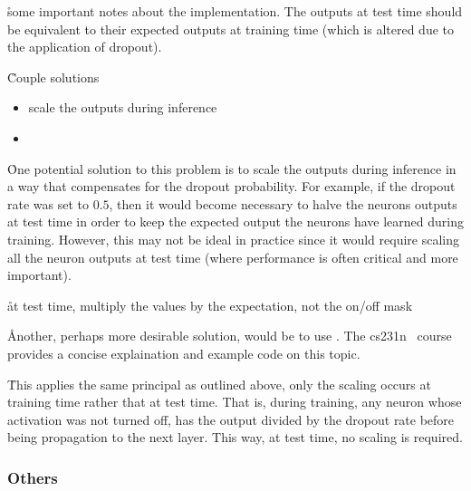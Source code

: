 \r{some important notes about the implementation. The outputs at test time should be equivalent to their expected outputs at training time (which is altered due to the application of dropout).}

\r{Couple solutions}
\begin{itemize}[noitemsep,topsep=0pt]
	\item scale the outputs during inference
	\item
\end{itemize}

\r{One potential solution to this problem is to scale the outputs during inference in a way that compensates for the dropout probability.  For example, if the dropout rate was set to $0.5$, then it would become necessary to halve the neurons outputs at test time in order to keep the expected output the neurons have learned during training.  However, this may not be ideal in practice since it would require scaling all the neuron outputs at test time (where performance is often critical and more important).}

\r{at test time, multiply the values by the expectation, not the on/off mask}

\r{Another, perhaps more desirable solution, would be to use . The cs231n~\cite{cs231n} course provides a concise explaination and example code on this topic.}

\r{This applies the same principal as outlined above, only the scaling occurs at training time rather that at test time. That is, during training, any neuron whose activation was not turned off, has the output divided by the dropout rate before being propagation to the next layer.  This way, at test time, no scaling is required.}


\subsubsection{Others}



